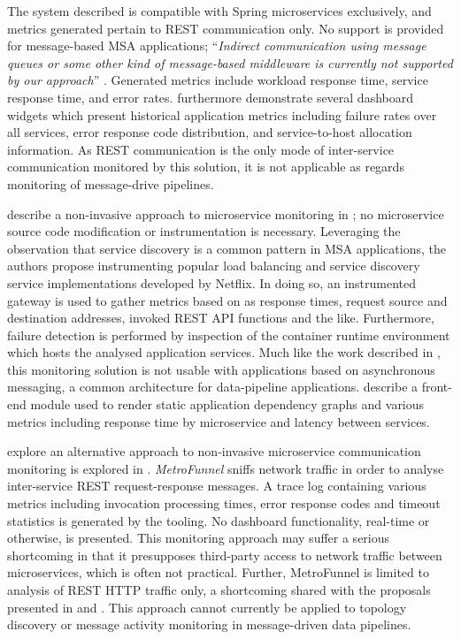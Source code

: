 The system described is compatible with Spring microservices exclusively, and metrics generated pertain to REST communication only. No support is provided for message-based MSA applications; ``\textit{Indirect communication using message queues or some other kind of message-based middleware is currently not supported by our approach}'' \cite{8359145}. Generated metrics include workload response time, service response time, and error rates.  \citeauthor{8359145} furthermore demonstrate several dashboard widgets which present historical application metrics including failure rates over all services, error response code distribution, and service-to-host allocation information.  As REST communication is the only mode of inter-service communication monitored by this solution, it  is not applicable as regards monitoring of message-drive pipelines.

\citeauthor{8548311} describe a non-invasive approach to microservice monitoring in \cite{8548311}; no microservice source code modification or instrumentation is necessary. Leveraging the observation that service discovery is a common pattern in MSA applications, the authors propose instrumenting popular load balancing and service discovery service implementations developed by Netflix. In doing so, an instrumented gateway is used to gather metrics based on as response times, request source and destination addresses, invoked REST API functions and the like. Furthermore, failure detection is performed by inspection of the container runtime environment which hosts the analysed application services. Much like the work described in \cite{8359145}, this monitoring solution is not usable with applications based on asynchronous messaging, a common architecture for data-pipeline applications. \citeauthor{8548311} describe a front-end module used to render static application dependency graphs and various metrics including response time by microservice and latency between services.

\citeauthor{8530769} explore an alternative approach to non-invasive microservice communication monitoring is explored in \cite{8530769}. \textit{MetroFunnel} sniffs network traffic in order to analyse inter-service REST request-response messages. A trace log containing various metrics including invocation processing times, error response codes and timeout statistics is generated by the tooling. No dashboard functionality, real-time or otherwise, is presented. This monitoring approach may suffer a serious shortcoming in that it presupposes third-party access to network traffic between microservices, which is often not practical. Further, MetroFunnel is limited to analysis of REST HTTP traffic only, a shortcoming shared with the proposals presented in \cite{8359145} and \cite{8548311}. This approach cannot currently be applied to topology discovery or message activity monitoring in message-driven data pipelines.

